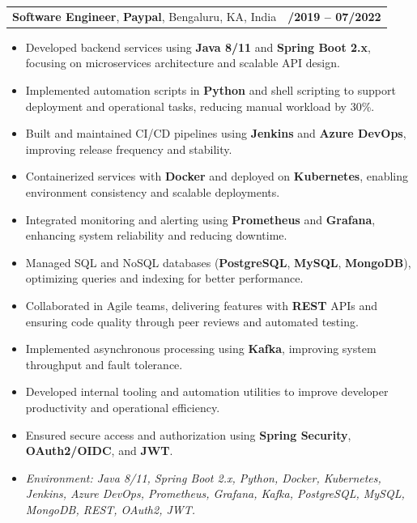 \documentclass[letterpaper,11pt]{article}
\makeatletter
\newcommand{\resumeItem}[1]{
  \item\footnotesize{
    {#1 \vspace{-2pt}}
  }
}
\newcommand{\resumeSubheading}[4]{
  \vspace{-2pt}\item
    \begin{tabular*}{1.0\textwidth}[t]{l@{\extracolsep{\fill}}r}
      \textbf{\fontsize{10pt}{14pt}\selectfont #3}, \textbf{\fontsize{10pt}{14pt}\selectfont #1}, \fontsize{10pt}{14pt}\selectfont #4 & \textbf{\fontsize{10pt}{14pt}\selectfont #2} \\
    \end{tabular*}\vspace{-7pt}
}
\newcommand{\resumeItemListStart}{\begin{itemize}[leftmargin=*]}
\newcommand{\resumeItemListEnd}{\end{itemize}\vspace{-5pt}}
\makeatother
\begin{document}
\resumeSubheading
{Paypal}{08/2019 -- 07/2022}
{Software Engineer}{Bengaluru, KA, India}
\resumeItemListStart
  \resumeItem{Developed backend services using \textbf{Java 8/11} and \textbf{Spring Boot 2.x}, focusing on microservices architecture and scalable API design.}
  \resumeItem{Implemented automation scripts in \textbf{Python} and shell scripting to support deployment and operational tasks, reducing manual workload by 30\%.}
  \resumeItem{Built and maintained CI/CD pipelines using \textbf{Jenkins} and \textbf{Azure DevOps}, improving release frequency and stability.}
  \resumeItem{Containerized services with \textbf{Docker} and deployed on \textbf{Kubernetes}, enabling environment consistency and scalable deployments.}
  \resumeItem{Integrated monitoring and alerting using \textbf{Prometheus} and \textbf{Grafana}, enhancing system reliability and reducing downtime.}
  \resumeItem{Managed SQL and NoSQL databases (\textbf{PostgreSQL}, \textbf{MySQL}, \textbf{MongoDB}), optimizing queries and indexing for better performance.}
  \resumeItem{Collaborated in Agile teams, delivering features with \textbf{REST} APIs and ensuring code quality through peer reviews and automated testing.}
  \resumeItem{Implemented asynchronous processing using \textbf{Kafka}, improving system throughput and fault tolerance.}
  \resumeItem{Developed internal tooling and automation utilities to improve developer productivity and operational efficiency.}
  \resumeItem{Ensured secure access and authorization using \textbf{Spring Security}, \textbf{OAuth2/OIDC}, and \textbf{JWT}.}
  \resumeItem{\textit{Environment: Java 8/11, Spring Boot 2.x, Python, Docker, Kubernetes, Jenkins, Azure DevOps, Prometheus, Grafana, Kafka, PostgreSQL, MySQL, MongoDB, REST, OAuth2, JWT.}}
\resumeItemListEnd
\end{document}

